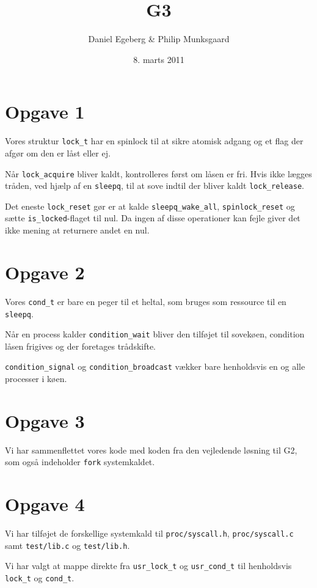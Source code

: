 \documentclass [10pt,a4paper]{article}
\title{G3}
\author{Daniel Egeberg \& Philip Munksgaard}
\date{8. marts 2011}
\begin{document}
\maketitle

\section*{Opgave 1} %

Vores struktur \verb+lock_t+ har en spinlock til at sikre atomisk adgang og et flag der afgør om den er låst eller ej.

Når \verb+lock_acquire+ bliver kaldt, kontrolleres først om låsen er fri. Hvis ikke lægges tråden, ved hjælp af en \verb+sleepq+, til at sove indtil der bliver kaldt \verb+lock_release+.

Det eneste \verb+lock_reset+ gør er at kalde \verb+sleepq_wake_all+, \verb+spinlock_reset+ og sætte \verb+is_locked+-flaget til nul. Da ingen af disse operationer kan fejle giver det ikke mening at returnere andet en nul.


\section*{Opgave 2} %

Vores \verb+cond_t+ er bare en peger til et heltal, som bruges som ressource til en \verb+sleepq+. 

Når en process kalder \verb+condition_wait+ bliver den tilføjet til sovekøen, condition låsen frigives og der foretages trådskifte.

\verb+condition_signal+ og \verb+condition_broadcast+ vækker bare henholdsvis en og alle processer i køen.

\section*{Opgave 3} %

Vi har sammenflettet vores kode med koden fra den vejledende løsning
til G2, som også indeholder \verb+fork+ systemkaldet.


\section*{Opgave 4} %

Vi har tilføjet de forskellige systemkald til \verb+proc/syscall.h+, \verb+proc/syscall.c+ samt \verb+test/lib.c+ og \verb+test/lib.h+.

Vi har valgt at mappe direkte fra \verb+usr_lock_t+ og \verb+usr_cond_t+ til henholdsvis \verb+lock_t+ og \verb+cond_t+.

\end{document}
